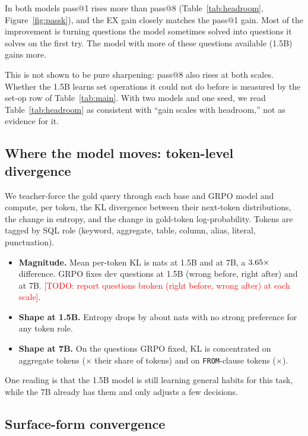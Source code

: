 \documentclass[11pt]{article}
\newcommand{\todo}[1]{\textcolor{red}{[TODO: #1]}}
\begin{document}
In both models pass@1 rises more than pass@8 (Table~\ref{tab:headroom},
Figure~\ref{fig:passk}), and the EX gain closely matches the pass@1 gain. Most of
the improvement is turning questions the model sometimes solved into questions
it solves on the first try. The model with more of these questions available
(1.5B) gains more.

This is not shown to be pure sharpening: pass@8 also rises at both scales.
Whether the 1.5B learns set operations it could not do before is measured by
the set-op row of Table~\ref{tab:main}. With two models and one seed, we read
Table~\ref{tab:headroom} as consistent with ``gain scales with headroom,'' not
as evidence for it.

\subsection{Where the model moves: token-level divergence}

We teacher-force the gold query through each base and GRPO model and compute,
per token, the KL divergence between their next-token distributions, the change
in entropy, and the change in gold-token log-probability. Tokens are tagged by
SQL role (keyword, aggregate, table, column, alias, literal, punctuation).

\begin{itemize}
  \item \textbf{Magnitude.} Mean per-token KL is \KLS{} nats at 1.5B and \KLL{}
        at 7B, a $3.65\times$ difference. GRPO fixes \FixedS{} dev questions at 1.5B
        (wrong before, right after) and \FixedL{} at 7B.
        \todo{report questions broken (right before, wrong after) at each scale}.
  \item \textbf{Shape at 1.5B.} Entropy drops by about \EntS{} nats with no strong
        preference for any token role.
  \item \textbf{Shape at 7B.} On the questions GRPO fixed, KL is concentrated on
        aggregate tokens (\ConcAggL$\times$ their share of tokens) and on
        \texttt{FROM}-clause tokens (\ConcFromL$\times$).
\end{itemize}

One reading is that the 1.5B model is still learning general habits for this
task, while the 7B already has them and only adjusts a few decisions.

\subsection{Surface-form convergence}
\end{document}
